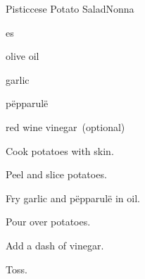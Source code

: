 \begin{recipe}{Pisticcese Potato Salad}{Nonna}{}

\begin{ingredients}
\item {}es
\item olive oil
\item garlic
\item pëpparulë
\item red wine vinegar~(optional)
\end{ingredients}

\begin{directions}
\item Cook potatoes with skin.
\item Peel and slice potatoes.
\item Fry garlic and pëpparulë in oil.
\item Pour over potatoes.
\item Add a dash of vinegar.
\item Toss.
\end{directions}

\end{recipe}
